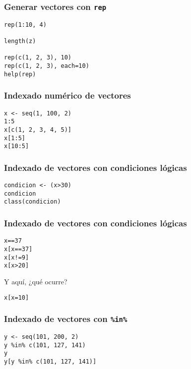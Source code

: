 \documentclass[bigger]{beamer}
\begin{document}
\begin{frame}[fragile]
\frametitle{Generar vectores con \texttt{rep}}
\label{sec-1-1-6}


\lstset{language=R}
\begin{lstlisting}
rep(1:10, 4)

length(z)

rep(c(1, 2, 3), 10)
rep(c(1, 2, 3), each=10)
help(rep)
\end{lstlisting}
\end{frame}
\begin{frame}[fragile]
\frametitle{Indexado numérico de vectores}
\label{sec-1-1-7}



\lstset{language=R}
\begin{lstlisting}
x <- seq(1, 100, 2)
1:5
x[c(1, 2, 3, 4, 5)]
x[1:5]
x[10:5]
\end{lstlisting}
\end{frame}
\begin{frame}[fragile]
\frametitle{Indexado de vectores con condiciones lógicas}
\label{sec-1-1-8}


\lstset{language=R}
\begin{lstlisting}
condicion <- (x>30)
condicion
class(condicion)
\end{lstlisting}
\end{frame}
\begin{frame}[fragile]
\frametitle{Indexado de vectores con condiciones lógicas}
\label{sec-1-1-9}



\lstset{language=R}
\begin{lstlisting}
x==37
x[x==37]
x[x!=9]
x[x>20]
\end{lstlisting}
\begin{block}{Y aquí, ¿qué ocurre?}
\label{sec-1-1-9-1}



\lstset{language=R}
\begin{lstlisting}
x[x=10]
\end{lstlisting}
\end{block}
\end{frame}
\begin{frame}[fragile]
\frametitle{Indexado de vectores con \texttt{\%in\%}}
\label{sec-1-1-10}


\lstset{language=R}
\begin{lstlisting}
y <- seq(101, 200, 2)
y %in% c(101, 127, 141)
y
y[y %in% c(101, 127, 141)]
\end{lstlisting}
\end{frame}
\end{document}
